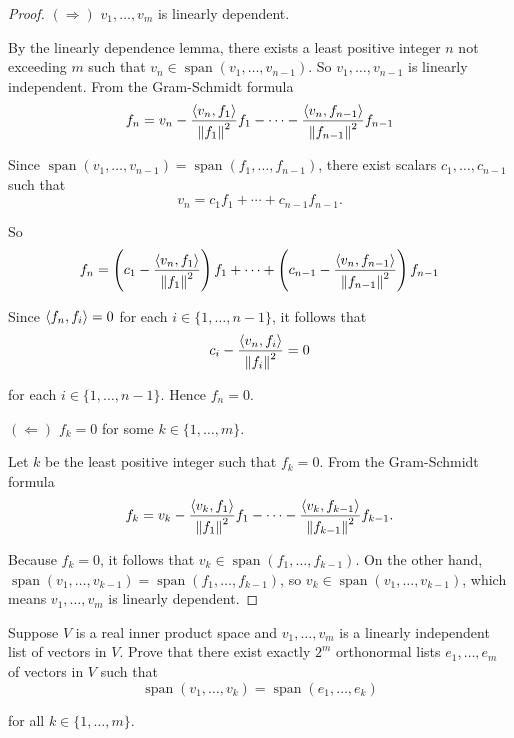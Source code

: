 \begin{proof}
    $(\Rightarrow)$ $v_{1} , \ldots, v_{m}$ is linearly dependent.

    By the linearly dependence lemma, there exists a least positive integer $n$ not exceeding $m$ such that $v_{n}\in\operatorname{span}(v_{1}, \ldots, v_{n-1})$. So $v_{1}, \ldots, v_{n-1}$ is linearly independent. From the Gram-Schmidt formula
    \[
        f_{n} = v_{n} - \frac{\left\langle{v_{n}, f_{1}}\right\rangle}{\left\Vert{f_{1}}\right\Vert^{2}}f_{1} - \cdots - \frac{\left\langle{v_{n}, f_{n-1}}\right\rangle}{\left\Vert{f_{n-1}}\right\Vert^{2}}f_{n-1}
    \]

    Since $\operatorname{span}(v_{1}, \ldots, v_{n-1}) = \operatorname{span}(f_{1}, \ldots, f_{n-1})$, there exist scalars $c_{1}, \ldots, c_{n-1}$ such that
    \[
        v_{n} = c_{1}f_{1} + \cdots + c_{n-1}f_{n-1}.
    \]

    So
    \[
        f_{n} = \left(c_{1} - \frac{\left\langle{v_{n}, f_{1}}\right\rangle}{\left\Vert{f_{1}}\right\Vert^{2}}\right)f_{1} + \cdots + \left( c_{n-1} - \frac{\left\langle{v_{n}, f_{n-1}}\right\rangle}{\left\Vert{f_{n-1}}\right\Vert^{2}} \right)f_{n-1}
    \]

    Since $\left\langle{f_{n}, f_{i}}\right\rangle = 0$ for each $i\in \{ 1, \ldots, n-1 \}$, it follows that
    \[
        c_{i} - \frac{\left\langle{v_{n}, f_{i}}\right\rangle}{\left\Vert{f_{i}}\right\Vert^{2}} = 0
    \]

    for each $i\in \{ 1, \ldots, n-1 \}$. Hence $f_{n} = 0$.

    \bigskip

    $(\Leftarrow)$ $f_{k} = 0$ for some $k\in\{1,\ldots, m\}$.

    Let $k$ be the least positive integer such that $f_{k} = 0$.
    From the Gram-Schmidt formula
    \[
        f_{k} = v_{k} - \frac{\left\langle{v_{k}, f_{1}}\right\rangle}{\left\Vert{f_{1}}\right\Vert^{2}}f_{1} - \cdots - \frac{\left\langle{v_{k}, f_{k-1}}\right\rangle}{\left\Vert{f_{k-1}}\right\Vert^{2}}f_{k-1}.
    \]

    Because $f_{k} = 0$, it follows that $v_{k}\in\operatorname{span}(f_{1}, \ldots, f_{k-1})$. On the other hand, $\operatorname{span}(v_{1}, \ldots, v_{k-1}) = \operatorname{span}(f_{1}, \ldots, f_{k-1})$, so $v_{k}\in\operatorname{span}(v_{1}, \ldots, v_{k-1})$, which means $v_{1}, \ldots, v_{m}$ is linearly dependent.
\end{proof}
\newpage

\begin{exercise}
    Suppose $V$ is a real inner product space and $v_{1} , \ldots, v_{m}$ is a linearly independent list of vectors in $V$. Prove that there exist exactly $2^{m}$ orthonormal lists $e_{1}, \ldots, e_{m}$ of vectors in $V$ such that
    \[
        \operatorname{span}(v_{1}, \ldots, v_{k}) = \operatorname{span}(e_{1}, \ldots, e_{k})
    \]

    for all $k\in\{1, \ldots, m\}$.
\end{exercise}

